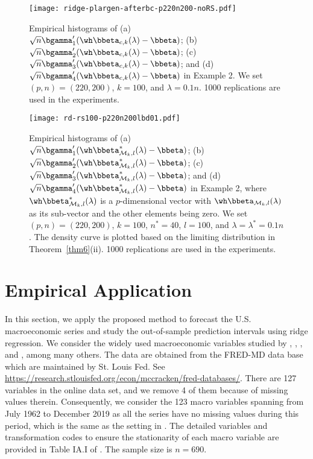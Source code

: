 {{\begin{figure}[ht]
\begin{center}
{\texttt{[image: ridge-plargen-afterbc-p220n200-noRS.pdf]}}
\caption{Empirical histograms of (a) $\sqrt{n}\bgamma_1'(\wh\bbeta_{c,k}(\lambda)-\bbeta)$; (b)  $\sqrt{n}\bgamma_2'(\wh\bbeta_{c,k}(\lambda)-\bbeta)$; (c) $\sqrt{n}\bgamma_3'(\wh\bbeta_{c,k}(\lambda)-\bbeta)$; and (d) $\sqrt{n}\bgamma_4'(\wh\bbeta_{c,k}(\lambda)-\bbeta)$ in Example 2. We set $(p,n)=(220,200)$, $k=100$, and $\lambda=0.1n$. 1000 replications are used in the experiments.  }\label{fig-4}
\end{center}
\end{figure}


\begin{figure}[ht]
\begin{center}
{\texttt{[image: rd-rs100-p220n200lbd01.pdf]}}
\caption{Empirical histograms of (a) $\sqrt{n}\bgamma_1'(\wh\bbeta_{\mathcal{M}_k,l}^*(\lambda)-\bbeta)$; (b)  $\sqrt{n}\bgamma_2'(\wh\bbeta_{\mathcal{M}_k,l}^*(\lambda)-\bbeta)$; (c) $\sqrt{n}\bgamma_3'(\wh\bbeta_{\mathcal{M}_k,l}^*(\lambda)-\bbeta)$; and (d) $\sqrt{n}\bgamma_4'(\wh\bbeta_{\mathcal{M}_k,l}^*(\lambda)-\bbeta)$ in Example 2, where $\wh\bbeta_{\mathcal{M}_k,l}^*(\lambda)$ is a $p$-dimensional vector with $\wh\bbeta_{\mathcal{M}_k,l}(\lambda)$ as its sub-vector and the other elements being zero. We set $(p,n)=(220,200)$, $k=100$, $n^*=40$, $l=100$, and $\lambda=\lambda^*=0.1n$. The density curve is plotted based on the limiting distribution in Theorem~\ref{thm6}(ii). 1000 replications are used in the experiments. }\label{fig-5}
\end{center}
\end{figure}


  
\section{Empirical Application} \label{sec40}

In this section, we apply the proposed method to forecast the U.S. macroeconomic series and study the out-of-sample prediction intervals using ridge regression. We consider the widely used macroeconomic variables studied by \cite{Stock2002}, \cite{mccracken2016fred}, \cite{giannone2021economic}, and \cite{gao2022modeling,gao2023supervised}, among many others. The data are obtained from the FRED-MD data base which are maintained by St. Louis Fed. See \url{https://research.stlouisfed.org/econ/mccracken/fred-databases/}. There are 127 variables in the online data set, and we remove 4 of them because of missing values therein.  Consequently, we consider the 123 macro variables spanning from July 1962 to December
2019 as all the series have no missing values during this period, which is the same as the setting in \cite{gao2023supervised}. The detailed variables and transformation codes to ensure the stationarity of each
macro variable are provided in Table IA.I of \cite{gao2023supervised}. The sample size is $n = 690$.


}}
